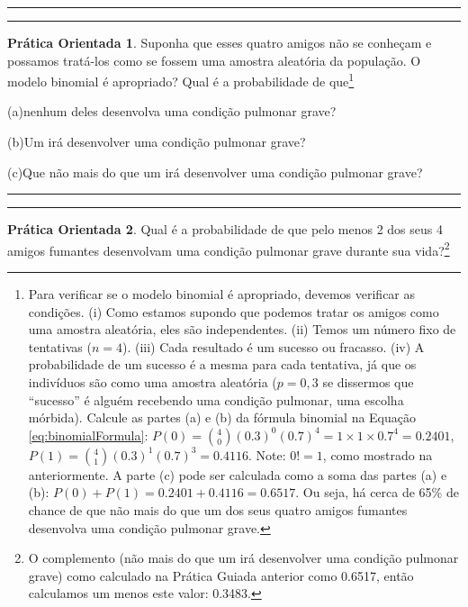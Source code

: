 \documentclass[
]{book}
\theoremstyle{definition}
\theoremstyle{definition}
\theoremstyle{definition}
\newtheorem{exercise}{Prática Orientada}[chapter]
\theoremstyle{definition}
\theoremstyle{remark}
\begin{document}
\begin{center}\rule{0.5\linewidth}{0.5pt}\end{center}

\begin{center}\rule{0.5\linewidth}{0.5pt}\end{center}

\begin{exercise}
\protect\hypertarget{exr:unnamed-chunk-132}{}{\label{exr:unnamed-chunk-132} }Suponha que esses quatro amigos não se conheçam e possamos tratá-los como se fossem uma amostra aleatória da população. O modelo binomial é apropriado? Qual é a probabilidade de que\footnote{Para verificar se o modelo binomial é apropriado, devemos verificar as condições. (i) Como estamos supondo que podemos tratar os amigos como uma amostra aleatória, eles são independentes. (ii) Temos um número fixo de tentativas (\(n=4\)). (iii) Cada resultado é um sucesso ou fracasso. (iv) A probabilidade de um sucesso é a mesma para cada tentativa, já que os indivíduos são como uma amostra aleatória (\(p=0,3\) se dissermos que ``sucesso'' é alguém recebendo uma condição pulmonar, uma escolha mórbida). Calcule as partes (a) e (b) da fórmula binomial na Equação \eqref{eq:binomialFormula}: \(P(0) = {4 \choose 0} (0.3)^0 (0.7)^4 = 1\times1\times0.7^4 = 0.2401\), \(P(1) = {4 \choose 1} (0.3)^1(0.7)^{3} = 0.4116\). Note: \(0!=1\), como mostrado na anteriormente. A parte (c) pode ser calculada como a soma das partes (a) e (b): \(P(0) + P(1) = 0.2401 + 0.4116 = 0.6517\). Ou seja, há cerca de 65\% de chance de que não mais do que um dos seus quatro amigos fumantes desenvolva uma condição pulmonar grave.}

(a)nenhum deles desenvolva uma condição pulmonar grave?

(b)Um irá desenvolver uma condição pulmonar grave?

(c)Que não mais do que um irá desenvolver uma condição pulmonar grave?
\end{exercise}

\begin{center}\rule{0.5\linewidth}{0.5pt}\end{center}

\begin{center}\rule{0.5\linewidth}{0.5pt}\end{center}

\begin{exercise}
\protect\hypertarget{exr:unnamed-chunk-133}{}{\label{exr:unnamed-chunk-133} }Qual é a probabilidade de que pelo menos 2 dos seus 4 amigos fumantes desenvolvam uma condição pulmonar grave durante sua vida?\footnote{O complemento (não mais do que um irá desenvolver uma condição pulmonar grave) como calculado na Prática Guiada anterior como 0.6517, então calculamos um menos este valor: 0.3483.}
\end{exercise}
\end{document}
